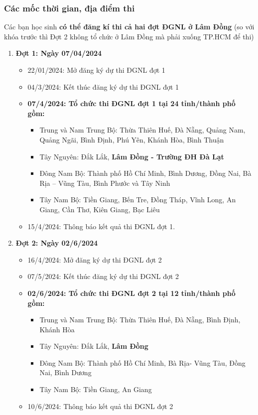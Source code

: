 \subsubsection{Các mốc thời gian, địa điểm thi} 
Các bạn học sinh \textbf{có thể đăng kí thi cả hai đợt ĐGNL ở Lâm Đồng} \cite{thoigian_diadiem} (so với khóa trước thì Đợt 2 không tổ chức ở Lâm Đồng mà phải xuống TP.HCM để thi)
\begin{enumerate}
    \item \textbf{Đợt 1: Ngày 07/04/2024}
    \begin{itemize}
        \item 22/01/2024: Mở đăng ký dự thi ĐGNL đợt 1
        \item 04/3/2024: Kết thúc đăng ký dự thi ĐGNL đợt 1
        \item \textbf{07/4/2024: Tổ chức thi ĐGNL đợt 1 tại 24 tỉnh/thành phố gồm:}
        \begin{itemize}
            \item Trung và Nam Trung Bộ: Thừa Thiên Huế, Đà Nẵng, Quảng Nam, Quảng Ngãi, Bình Định, Phú Yên, Khánh Hòa, Bình Thuận
            \item Tây Nguyên: Đắk Lắk, \textbf{Lâm Đồng - Trường ĐH Đà Lạt}
            \item Đông Nam Bộ: Thành phố Hồ Chí Minh, Bình Dương, Đồng Nai, Bà Rịa – Vũng Tàu, Bình Phước và Tây Ninh
            \item Tây Nam Bộ: Tiền Giang, Bến Tre, Đồng Tháp, Vĩnh Long, An Giang, Cần Thơ, Kiên Giang, Bạc Liêu
        \end{itemize}
        \item 15/4/2024: Thông báo kết quả thi ĐGNL đợt 1.
    \end{itemize}
    \item \textbf{Đợt 2: Ngày 02/6/2024}
    \begin{itemize}
        \item 16/4/2024: Mở đăng ký dự thi ĐGNL đợt 2
        \item 07/5/2024: Kết thúc đăng ký dự thi ĐGNL đợt 2
        \item \textbf{02/6/2024: Tổ chức thi ĐGNL đợt 2 tại 12 tỉnh/thành phố gồm:}
        \begin{itemize}
            \item Trung và Nam Trung Bộ: Thừa Thiên Huế, Đà Nẵng, Bình Định, Khánh Hòa
            \item Tây Nguyên: Đắk Lắk, \textbf{Lâm Đồng}
            \item Đông Nam Bộ: Thành phố Hồ Chí Minh, Bà Rịa- Vũng Tàu, Đồng Nai, Bình Dương
            \item Tây Nam Bộ: Tiền Giang, An Giang
        \end{itemize}
        \item 10/6/2024: Thông báo kết quả thi ĐGNL đợt 2
    \end{itemize}
\end{enumerate}

